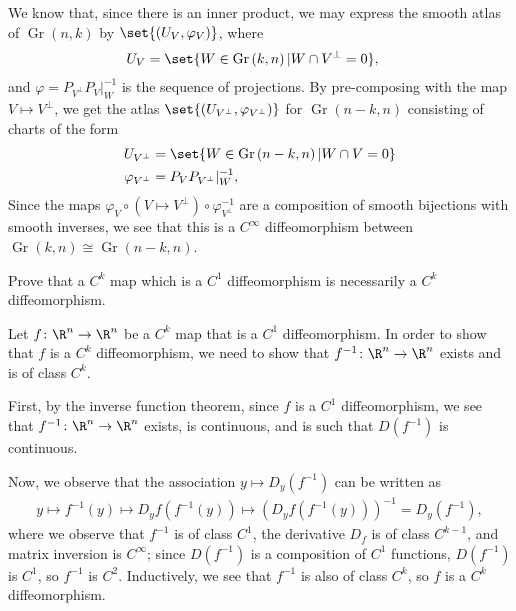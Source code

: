 \documentclass[10pt]{mypackage}
\begin{document}
\begin{solution}
  We know that, since there is an inner product, we may express the smooth atlas of $\operatorname{Gr}\left( n,k \right)$ by $\set{\left( U_V,\varphi_V \right)}$, where
  \begin{align*}
    U_V &= \set{W\in \operatorname{Gr}\left( k,n \right) | W\cap V^{\perp} = 0},
  \end{align*}
  and $\varphi = P_{V^{\perp}} P_{V}|_{W}^{-1}$ is the sequence of projections. By pre-composing with the map $V\mapsto V^{\perp}$, we get the atlas $\set{\left( U_{V^{\perp}},\varphi_{V^{\perp}} \right)}$ for $\operatorname{Gr}\left( n-k,n \right)$ consisting of charts of the form
  \begin{align*}
    U_{V^{\perp}} &= \set{W\in \operatorname{Gr}\left( n-k,n \right) | W\cap V = 0}\\
    \varphi_{V^{\perp}} &= P_{V}P_{V^{\perp}}|_{W}^{-1},
  \end{align*}
  Since the maps $\varphi_{V}\circ \left( V\mapsto V^{\perp} \right)\circ \varphi_{V^{\perp}}^{-1}$ are a composition of smooth bijections with smooth inverses, we see that this is a $C^{\infty}$ diffeomorphism between $\operatorname{Gr}\left( k,n \right) \cong \operatorname{Gr}\left( n-k,n \right)$.
\end{solution}
\begin{problem}[Problem 3]
  Prove that a $C^{k}$ map which is a $C^{1}$ diffeomorphism is necessarily a $C^{k}$ diffeomorphism.
\end{problem}
\begin{solution}
  Let $f\colon \R^{n}\rightarrow \R^{n}$ be a $C^{k}$ map that is a $C^{1}$ diffeomorphism. In order to show that $f$ is a $C^{k}$ diffeomorphism, we need to show that $f^{-1}\colon \R^{n}\rightarrow \R^{n}$ exists and is of class $C^{k}$.\newline

  First, by the inverse function theorem, since $f$ is a $C^{1}$ diffeomorphism, we see that $f^{-1}\colon \R^{n}\rightarrow \R^{n}$ exists, is continuous, and is such that $D\left( f^{-1} \right)$ is continuous.\newline

  Now, we observe that the association $y\mapsto D_y\left( f^{-1} \right)$ can be written as
  \begin{align*}
    y \mapsto f^{-1}(y) \mapsto D_{y}f\left( f^{-1}(y) \right) \mapsto \left( D_yf\left( f^{-1}\left( y \right) \right) \right)^{-1} = D_y\left( f^{-1} \right),
  \end{align*}
  where we observe that $f^{-1}$ is of class $C^1$, the derivative $D_f$ is of class $C^{k-1}$, and matrix inversion is $C^{\infty}$; since $D\left( f^{-1} \right)$ is a composition of $C^{1}$ functions, $D\left( f^{-1} \right)$ is $C^{1}$, so $f^{-1}$ is $C^{2}$. Inductively, we see that $f^{-1}$ is also of class $C^{k}$, so $f$ is a $C^{k}$ diffeomorphism.
\end{solution}
\end{document}
